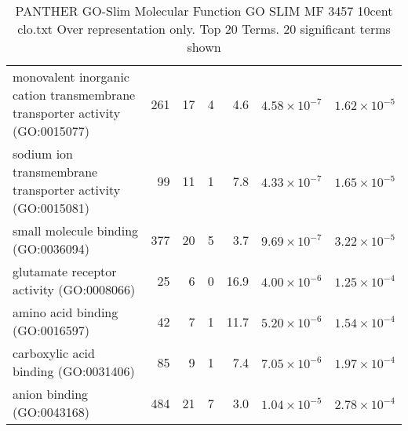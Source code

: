 \begin{table}[ht]
\begin{adjustbox}{width=\textwidth}
\begin{tabular}{lrrrrrr}
  monovalent inorganic cation transmembrane transporter activity (GO:0015077) & 261 & 17 & 4 & 4.6 & $4.58 \times 10^{-7}$ & $1.62 \times 10^{-5}$ \\ 
  sodium ion transmembrane transporter activity (GO:0015081) & 99 & 11 & 1 & 7.8 & $4.33 \times 10^{-7}$ & $1.65 \times 10^{-5}$ \\ 
  small molecule binding (GO:0036094) & 377 & 20 & 5 & 3.7 & $9.69 \times 10^{-7}$ & $3.22 \times 10^{-5}$ \\ 
  glutamate receptor activity (GO:0008066) & 25 & 6 & 0 & 16.9 & $4.00 \times 10^{-6}$ & $1.25 \times 10^{-4}$ \\ 
  amino acid binding (GO:0016597) & 42 & 7 & 1 & 11.7 & $5.20 \times 10^{-6}$ & $1.54 \times 10^{-4}$ \\ 
  carboxylic acid binding (GO:0031406) & 85 & 9 & 1 & 7.4 & $7.05 \times 10^{-6}$ & $1.97 \times 10^{-4}$ \\ 
  anion binding (GO:0043168) & 484 & 21 & 7 & 3.0 & $1.04 \times 10^{-5}$ & $2.78 \times 10^{-4}$ \\ 
   \hline
\end{tabular}
\end{adjustbox}
\caption{PANTHER GO-Slim Molecular Function GO SLIM MF 3457 10cent clo.txt Over representation only. Top 20 Terms. 20 significant terms shown} 
\label{tab:PANTHER GO-Slim Molecular Function GO SLIM MF 3457 10cent clo.txt Over representation only. Top 20 Terms. 20 significant terms shown}
\end{table}


